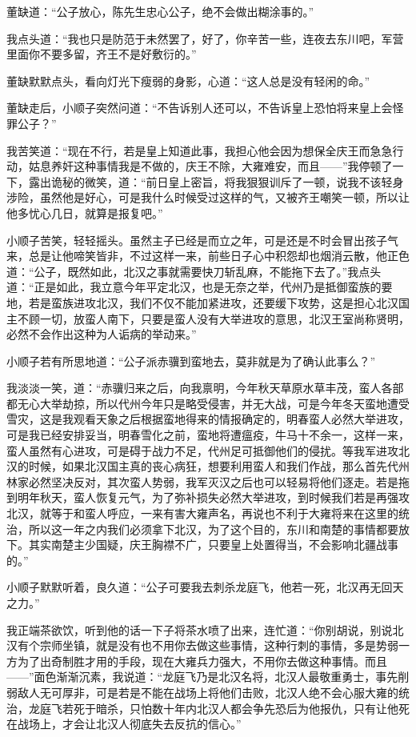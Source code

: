 董缺道：“公子放心，陈先生忠心公子，绝不会做出糊涂事的。”

我点头道：“我也只是防范于未然罢了，好了，你辛苦一些，连夜去东川吧，军营里面你不要多留，齐王不是好敷衍的。”

董缺默默点头，看向灯光下瘦弱的身影，心道：“这人总是没有轻闲的命。”

董缺走后，小顺子突然问道：“不告诉别人还可以，不告诉皇上恐怕将来皇上会怪罪公子？”

我苦笑道：“现在不行，若是皇上知道此事，我担心他会因为想保全庆王而急急行动，姑息养奸这种事情我是不做的，庆王不除，大雍难安，而且——”我停顿了一下，露出诡秘的微笑，道：“前日皇上密旨，将我狠狠训斥了一顿，说我不该轻身涉险，虽然他是好心，可是我什么时候受过这样的气，又被齐王嘲笑一顿，所以让他多忧心几日，就算是报复吧。”

小顺子苦笑，轻轻摇头。虽然主子已经是而立之年，可是还是不时会冒出孩子气来，总是让他啼笑皆非，不过这样一来，前些日子心中积怨却也烟消云散，他正色道：“公子，既然如此，北汉之事就需要快刀斩乱麻，不能拖下去了。”我点头道：“正是如此，我立意今年平定北汉，也是无奈之举，代州乃是抵御蛮族的要地，若是蛮族进攻北汉，我们不仅不能加紧进攻，还要缓下攻势，这是担心北汉国主不顾一切，放蛮人南下，只要是蛮人没有大举进攻的意思，北汉王室尚称贤明，必然不会作出这种为人诟病的举动来。”

小顺子若有所思地道：“公子派赤骥到蛮地去，莫非就是为了确认此事么？”

我淡淡一笑，道：“赤骥归来之后，向我禀明，今年秋天草原水草丰茂，蛮人各部都无心大举劫掠，所以代州今年只是略受侵害，并无大战，可是今年冬天蛮地遭受雪灾，这是我观看天象之后根据蛮地得来的情报确定的，明春蛮人必然大举进攻，可是我已经安排妥当，明春雪化之前，蛮地将遭瘟疫，牛马十不余一，这样一来，蛮人虽然有心进攻，可是碍于战力不足，代州足可抵御他们的侵扰。等我军进攻北汉的时候，如果北汉国主真的丧心病狂，想要利用蛮人和我们作战，那么首先代州林家必然坚决反对，其次蛮人势弱，我军灭汉之后也可以轻易将他们逐走。若是拖到明年秋天，蛮人恢复元气，为了弥补损失必然大举进攻，到时候我们若是再强攻北汉，就等于和蛮人呼应，一来有害大雍声名，再说也不利于大雍将来在这里的统治，所以这一年之内我们必须拿下北汉，为了这个目的，东川和南楚的事情都要放下。其实南楚主少国疑，庆王胸襟不广，只要皇上处置得当，不会影响北疆战事的。”

小顺子默默听着，良久道：“公子可要我去刺杀龙庭飞，他若一死，北汉再无回天之力。”

我正端茶欲饮，听到他的话一下子将茶水喷了出来，连忙道：“你别胡说，别说北汉有个宗师坐镇，就是没有也不用你去做这些事情，这种行刺的事情，多是势弱一方为了出奇制胜才用的手段，现在大雍兵力强大，不用你去做这种事情。而且——”面色渐渐沉素，我说道：“龙庭飞乃是北汉名将，北汉人最敬重勇士，事先削弱敌人无可厚非，可是若是不能在战场上将他们击败，北汉人绝不会心服大雍的统治，龙庭飞若死于暗杀，只怕数十年内北汉人都会争先恐后为他报仇，只有让他死在战场上，才会让北汉人彻底失去反抗的信心。”

